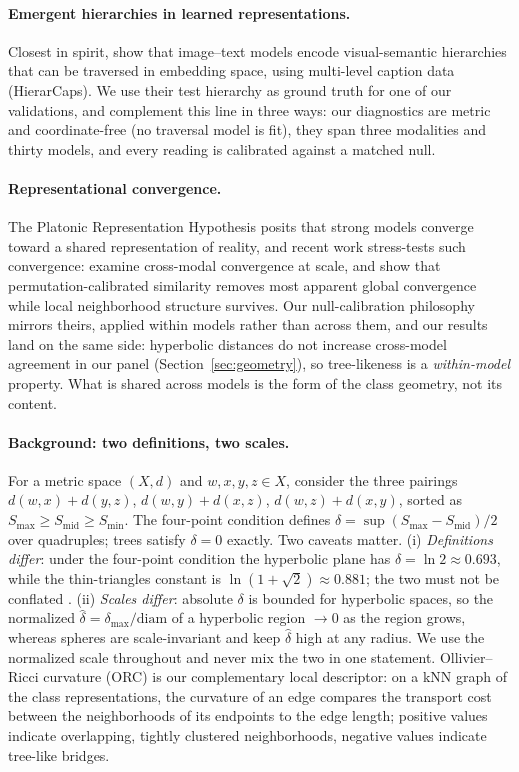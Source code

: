 \documentclass{article} %
\begin{document}
\paragraph{Emergent hierarchies in learned representations.} Closest in spirit, \citet{alper2024hierarcaps} show that image--text models encode visual-semantic hierarchies that can be traversed in embedding space, using multi-level caption data (HierarCaps). We use their test hierarchy as ground truth for one of our validations, and complement this line in three ways: our diagnostics are metric and coordinate-free (no traversal model is fit), they span three modalities and thirty models, and every reading is calibrated against a matched null.

\paragraph{Representational convergence.} The Platonic Representation Hypothesis \citep{huh2024platonic} posits that strong models converge toward a shared representation of reality, and recent work stress-tests such convergence: \citet{koepke2026cave} examine cross-modal convergence at scale, and \citet{groger2026aristotelian} show that permutation-calibrated similarity removes most apparent global convergence while local neighborhood structure survives.
Our null-calibration philosophy mirrors theirs, applied within models rather than across them, and our results land on the same side: hyperbolic distances do not increase cross-model agreement in our panel (Section~\ref{sec:geometry}), so tree-likeness is a \emph{within-model} property. What is shared across models is the form of the class geometry, not its content.

\paragraph{Background: two definitions, two scales.} For a metric space $(X,d)$ and $w,x,y,z \in X$, consider the three pairings $d(w,x){+}d(y,z)$, $d(w,y){+}d(x,z)$, $d(w,z){+}d(x,y)$, sorted as $S_{\max} \ge S_{\mathrm{mid}} \ge S_{\min}$. The four-point condition defines $\delta = \sup (S_{\max}-S_{\mathrm{mid}})/2$ over quadruples; trees satisfy $\delta = 0$ exactly. Two caveats matter. (i) \emph{Definitions differ}: under the four-point condition the hyperbolic plane has $\delta = \ln 2 \approx 0.693$, while the thin-triangles constant is $\ln(1+\sqrt{2}) \approx 0.881$; the two must not be conflated \citep{nica2016strong}.
(ii) \emph{Scales differ}: absolute $\delta$ is bounded for hyperbolic spaces, so the normalized $\hat\delta = \delta_{\max}/\mathrm{diam}$ of a hyperbolic region $\to 0$ as the region grows, whereas spheres are scale-invariant and keep $\hat\delta$ high at any radius. We use the normalized scale throughout and never mix the two in one statement. Ollivier--Ricci curvature (ORC) \citep{ollivier2009ricci} is our complementary local descriptor: on a kNN graph of the class representations, the curvature of an edge compares the transport cost between the neighborhoods of its endpoints to the edge length; positive values indicate overlapping, tightly clustered neighborhoods, negative values indicate tree-like bridges.
\end{document}
